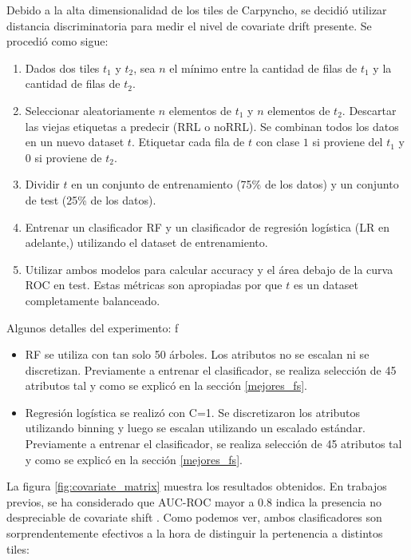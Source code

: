 Debido a la alta dimensionalidad de los tiles de Carpyncho, se decidió utilizar distancia discriminatoria para medir el nivel de covariate drift presente. Se procedió como sigue:

\begin{enumerate}
\item Dados dos tiles $t_1$ y $t_2$, sea $n$ el mínimo entre la cantidad de filas de $t_1$ y la cantidad de filas de $t_2$. 
\item Seleccionar aleatoriamente $n$ elementos de $t_1$ y $n$ elementos de $t_2$. Descartar las viejas etiquetas a predecir (RRL o noRRL). Se combinan todos los datos en un nuevo dataset $t$. Etiquetar cada fila de $t$ con clase $1$ si proviene del $t_1$ y $0$ si proviene de $t_2$. 
\item Dividir $t$ en un conjunto de entrenamiento (75\% de los datos) y un conjunto de test (25\% de los datos).
\item Entrenar un clasificador RF y un clasificador de regresión logística (LR en adelante,\cite{statisticallearning}) utilizando el dataset de entrenamiento.
\item Utilizar ambos modelos para calcular accuracy y el área debajo de la curva ROC en test. Estas métricas son apropiadas por que $t$ es un dataset completamente balanceado.
\end{enumerate}

Algunos detalles del experimento:
f
\begin{itemize}
\item RF se utiliza con tan solo 50 árboles. Los atributos no se escalan ni se discretizan. Previamente a entrenar el clasificador, se realiza selección de 45 atributos tal y como se explicó en la sección \ref{mejores_fs}.
\item Regresión logística se realizó con C=1. Se discretizaron los atributos utilizando binning y luego se escalan utilizando un escalado estándar. Previamente a entrenar el clasificador, se realiza selección de 45 atributos tal y como se explicó en la sección \ref{mejores_fs}.
\end{itemize}

La figura \ref{fig:covariate_matrix} muestra los resultados obtenidos. En trabajos previos, se ha considerado que AUC-ROC mayor a 0.8 indica la presencia no despreciable de covariate shift \cite{GeetaDharani2019CovariateSA}. Como podemos ver, ambos clasificadores son sorprendentemente efectivos a la hora de distinguir la pertenencia a distintos tiles:

